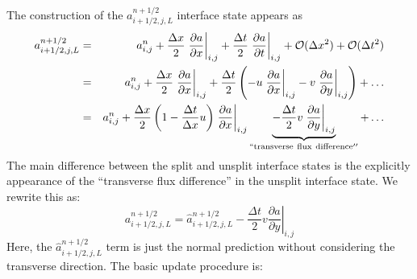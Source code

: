 The construction of the $a_{i+1/2,j,L}^{n+1/2}$ interface state appears as
\begin{eqnarray}
a_{i+1/2,j,L}^{n+1/2} &=& a_{i,j}^n + 
  \frac{\Delta x}{2} \left .\frac{\partial a}{\partial x} \right |_{i,j} + 
  \frac{\Delta t}{2} \left .\frac{\partial a}{\partial t} \right |_{i,j} + 
  \mathcal{O}(\Delta x^2) + \mathcal{O}(\Delta t^2) \nonumber \\
 &=& a_{i,j}^n + 
   \frac{\Delta x}{2} \left .\frac{\partial a}{\partial x} \right |_{i,j} + 
   \frac{\Delta t}{2} \left ( 
   - u \left .\frac{\partial a}{\partial x} \right |_{i,j} 
   - v \left .\frac{\partial a}{\partial y} \right |_{i,j} \right
   ) + \ldots \nonumber \\
    &=& a_{i,j}^n + 
   \frac{\Delta x}{2} \left ( 1 - \frac{\Delta t}{\Delta x} u \right ) 
   \left .\frac{\partial a}{\partial x} \right |_{i,j} \underbrace{-
   \frac{\Delta t}{2} v \left .\frac{\partial a}{\partial y} \right |_{i,j}}_{\mathrm{``transverse~flux~difference''}} +
   \ldots \label{eq:statelu}
\end{eqnarray}
The main difference between the split and unsplit interface states is the
explicitly appearance of the ``transverse flux difference'' in the unsplit
interface state.  We rewrite this as:
\begin{equation}
a_{i+1/2,j,L}^{n+1/2} = \hat{a}_{i+1/2,j,L}^{n+1/2} 
   - \frac{\Delta t}{2} v \left .\frac{\partial a}{\partial y} \right |_{i,j}
\end{equation}
Here, the $\hat{a}_{i+1/2,j,L}^{n+1/2}$ term is just the normal
prediction without considering the transverse direction.  The basic
update procedure is:
